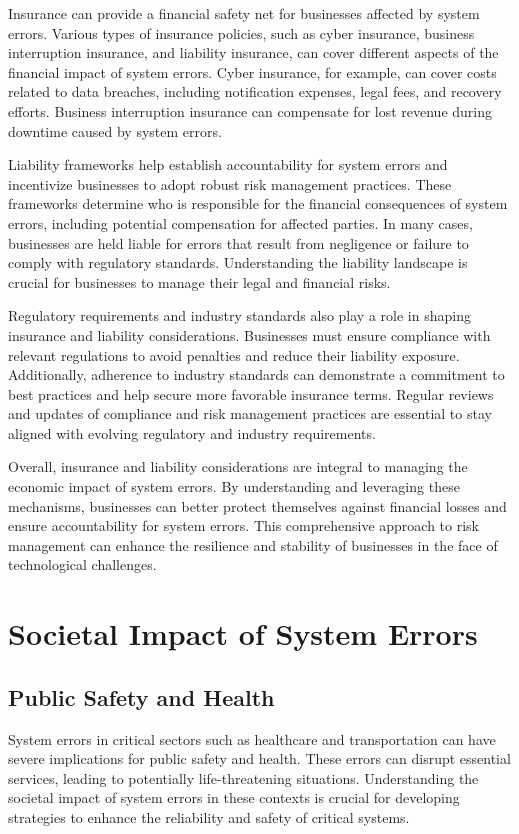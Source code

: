 \documentclass[10pt, conference, letterpaper]{IEEEtran}
\begin{document}
Insurance can provide a financial safety net for businesses affected by system errors. Various types of insurance policies, such as cyber insurance, business interruption insurance, and liability insurance, can cover different aspects of the financial impact of system errors. Cyber insurance, for example, can cover costs related to data breaches, including notification expenses, legal fees, and recovery efforts. Business interruption insurance can compensate for lost revenue during downtime caused by system errors.

Liability frameworks help establish accountability for system errors and incentivize businesses to adopt robust risk management practices. These frameworks determine who is responsible for the financial consequences of system errors, including potential compensation for affected parties. In many cases, businesses are held liable for errors that result from negligence or failure to comply with regulatory standards. Understanding the liability landscape is crucial for businesses to manage their legal and financial risks.

Regulatory requirements and industry standards also play a role in shaping insurance and liability considerations. Businesses must ensure compliance with relevant regulations to avoid penalties and reduce their liability exposure. Additionally, adherence to industry standards can demonstrate a commitment to best practices and help secure more favorable insurance terms. Regular reviews and updates of compliance and risk management practices are essential to stay aligned with evolving regulatory and industry requirements.

Overall, insurance and liability considerations are integral to managing the economic impact of system errors. By understanding and leveraging these mechanisms, businesses can better protect themselves against financial losses and ensure accountability for system errors. This comprehensive approach to risk management can enhance the resilience and stability of businesses in the face of technological challenges.

\section{Societal Impact of System Errors}
\subsection{Public Safety and Health}
System errors in critical sectors such as healthcare and transportation can have severe implications for public safety and health. These errors can disrupt essential services, leading to potentially life-threatening situations. Understanding the societal impact of system errors in these contexts is crucial for developing strategies to enhance the reliability and safety of critical systems.
\end{document}
